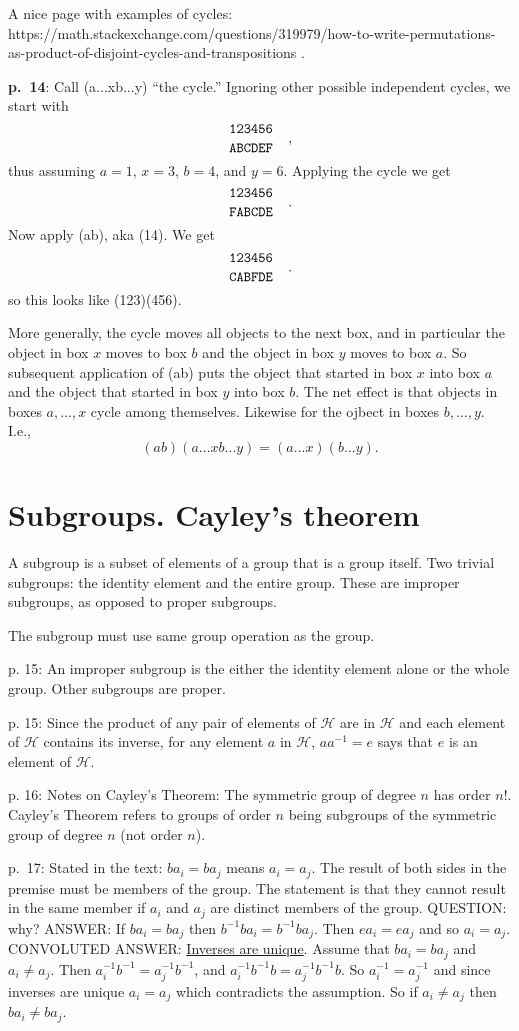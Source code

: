 \documentclass{book}
\begin{document}
A nice page with examples of cycles:
https://math.stackexchange.com/questions/319979/how-to-write-permutations-as-product-of-disjoint-cycles-and-transpositions
.

{\bf p.\ 14}: Call (a...xb...y) ``the cycle.'' Ignoring other possible
independent cycles, we start with
$$
\genfrac{}{}{0pt}0{\tt 123456}{\tt ABCDEF}\quad,
$$
thus assuming $a=1$, $x=3$, $b=4$, and $y=6$. Applying the cycle we get
$$
\genfrac{}{}{0pt}0{\tt 123456}{\tt FABCDE}\quad.
$$
Now apply (ab), aka (14). We get
$$
\genfrac{}{}{0pt}0{\tt 123456}{\tt CABFDE}\quad.
$$
so this looks like (123)(456).

More generally, the cycle moves all objects to the next box, and in
particular the object in box $x$ moves to box $b$ and the object in
box $y$ moves to box $a$. So subsequent application of (ab) puts the
object that started in box $x$ into box $a$ and the object that
started in box $y$ into box $b$. The net effect is that objects in
boxes $a,...,x$ cycle among themselves. Likewise for the ojbect in
boxes $b,...,y$. I.e.,
$$
(ab)(a...xb...y) = (a...x)(b...y).
$$

\section{Subgroups. Cayley's theorem}

A subgroup is a subset of elements of a group that is a group
itself. Two trivial subgroups: the identity element and the entire
group. These are improper subgroups, as opposed to proper subgroups.

The subgroup must use same group operation as the group.

p. 15: An improper subgroup is the either the identity element alone or the whole group. Other subgroups are proper.

p. 15: Since the product of any pair of elements of $\mathcal H$ are
in $\mathcal H$ and each element of $\mathcal H$ contains its inverse,
for any element $a$ in $\mathcal H$, $aa^{-1} = e$ says that $e$ is an
element of $\mathcal H$.

p. 16: Notes on Cayley's Theorem: The symmetric group of degree $n$
has order $n!$. Cayley's Theorem refers to groups of order $n$ being
subgroups of the symmetric group of degree $n$ (not order $n$).

p.\ 17: Stated in the text: $ba_i = ba_j$ means $a_i = a_j$. The
result of both sides in the premise must be members of the group. The
statement is that they cannot result in the same member if $a_i$ and
$a_j$ are distinct members of the group. QUESTION: why? ANSWER: If
$ba_i = ba_j$ then $b^{-1}ba_i = b^{-1}ba_j$. Then $ea_i = ea_j$ and
so $a_i = a_j$. CONVOLUTED ANSWER:
\href{https://planetmath.org/uniquenessofinverseforgroups}{Inverses
  are unique}. Assume that $ba_i = ba_j$ and $a_i \neq a_j$. Then
$a^{-1}_i b^{-1} = a^{-1}_j b^{-1}$, and $a^{-1}_i b^{-1} b = a^{-1}_j
b^{-1} b$. So $a^{-1}_i = a^{-1}_j$ and since inverses are unique $a_i
= a_j$ which contradicts the assumption. So if $a_i \neq a_j$ then
$ba_i \neq ba_j$.
\end{document}
